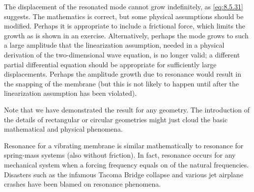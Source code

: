 The displacement of the resonated mode cannot grow indefinitely, as \eqref{eq:8.5.31} suggests.  The mathematics is correct, but some physical assumptions should be modified.  Perhaps it is appropriate to include a frictional force, which limits the growth as is shown in an exercise.  Alternatively, perhaps the mode grows to such a large amplitude that the linearization assumption, needed in a physical derivation of the two-dimensional wave equation, is no longer valid; a different partial differential equation should be appropriate for sufficiently large displacements.  Perhaps the amplitude growth due to resonance would result in the snapping of the membrane (but this is not likely to happen until after the linearization assumption has been violated).

Note that we have demonstrated the result for any geometry.  The introduction of the details of rectangular or circular geometries might just cloud the basic mathematical and physical phenomena.

Resonance for a vibrating membrane is similar mathematically to resonance for spring-mass systems (also without friction).  In fact, resonance occurs for any mechanical system when a forcing frequency equals on of the natural frequencies.  Disasters such as the infamous Tacoma Bridge collapse and various jet airplane crashes have been blamed on resonance phenomena.

